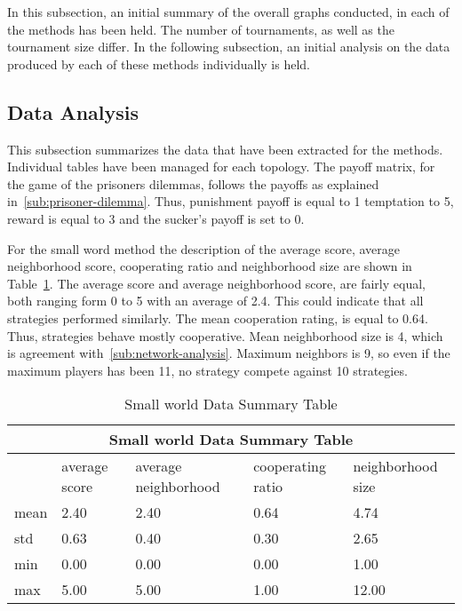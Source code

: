 In this subsection, an initial summary of the overall graphs conducted, in
each of the methods has been held. The number of tournaments, as well as the
tournament size differ. In the following subsection, an initial analysis on the
data produced by each of these methods individually is held.

\subsection{Data Analysis}
This subsection summarizes the data that have been extracted for the methods.
Individual tables have been managed for each topology. The payoff matrix, for
the game of the prisoners dilemmas, follows the payoffs as explained in~\autoref{sub:prisoner-dilemma}.
Thus, punishment payoff is equal to 1 temptation to 5, reward is equal to 3 and
the sucker's payoff is set to 0.

For the small word method the description of the average score, average
neighborhood score, cooperating ratio and neighborhood size are shown in
Table~\ref{table:summary-small-data}. The average score and average
neighborhood score, are fairly equal, both ranging form 0 to 5 with an average of
2.4. This could indicate that all strategies performed similarly. The mean
cooperation rating, is equal to 0.64. Thus, strategies behave mostly cooperative.
Mean neighborhood size is 4, which is agreement with~\autoref{sub:network-analysis}.
Maximum neighbors is 9, so even if the maximum players has been 11, no strategy
compete against 10 strategies.

\begin{table}[!hbtp]
	\centering
	\begin{adjustbox}{width=0.8\textwidth}
		\small
		\begin{tabular}{|l|l|l|l|l|}
			\hline
			\multicolumn{5}{|c|}{Small world Data Summary Table}                                \\ \hline
			     & average score & average neighborhood & cooperating ratio & neighborhood size \\ \hline
			mean & 2.40          & 2.40                 & 0.64              & 4.74              \\ \hline
			std  & 0.63          & 0.40                 & 0.30              & 2.65              \\ \hline
			min  & 0.00          & 0.00                 & 0.00              & 1.00              \\ \hline
			max  & 5.00          & 5.00                 & 1.00              & 12.00             \\ \hline
		\end{tabular}
	\end{adjustbox}
	\caption{Small world Data Summary Table}
	\label{table:summary-small-data}
\end{table}

